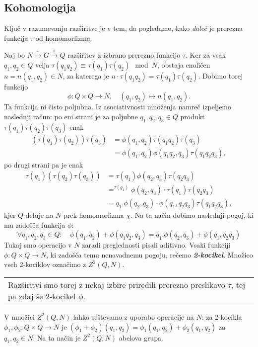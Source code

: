 \documentclass[11pt]{book}
\def\definicija{\color{rdeca}\bf\em}
\theoremstyle{definition}
\theoremstyle{zgled}
\theoremstyle{odprtproblem}
\theoremstyle{domacanaloga}
\theoremstyle{izrek}
\newenvironment{povzetek}
    {
\smallskip
\begin{center}
\color{svetlosiva}
\begin{tabular}{|p{0.7\textwidth}}
    }
    {
\end{tabular}
\end{center}
\smallskip
    }
\begin{document}
\subsection{Kohomologija}

Ključ v razumevanju razširitve je v tem, da pogledamo, kako {\em daleč} je prerezna funkcija $\tau$ od homomorfizma.

Naj bo $N \xrightarrow{\iota} G \xrightarrow{\pi} Q$ razširitev z izbrano prerezno funkcijo $\tau$. Ker za vsak $q_1, q_2 \in Q$ velja $\tau(q_1 q_2) \equiv \tau(q_1) \tau(q_2) \mod{N}$, obstaja enoličen $n = n(q_1, q_2) \in N$, za katerega je $n \cdot \tau(q_1q_2) = \tau(q_1)\tau(q_2)$. Dobimo torej funkcijo
\[
\phi \colon Q \times Q \to N, \quad (q_1, q_2) \mapsto n(q_1, q_2).
\]
Ta funkcija ni čisto poljubna. Iz asociativnosti množenja namreč izpeljemo naslednji račun: po eni strani je za poljubne $q_1, q_2, q_3 \in Q$ produkt $\tau(q_1) \tau(q_2) \tau(q_3)$ enak
\begin{align*}
(\tau(q_1) \tau(q_2)) \tau(q_3) &= \phi(q_1, q_2) \tau(q_1 q_2) \tau(q_3) \\
&= \phi(q_1, q_2) \phi(q_1 q_2, q_3) \tau(q_1 q_2 q_3),
\end{align*}
po drugi strani pa je enak
\begin{align*}
\tau(q_1) (\tau(q_2) \tau(q_3)) &= \tau(q_1) \phi(q_2, q_3) \tau(q_2 q_3) \\
&= ^{\tau(q_1)} \phi(q_2, q_3) \cdot \tau(q_1) \tau(q_2 q_3) \\
&= q_1.\phi(q_2, q_3) \cdot \phi(q_1, q_2 q_3) \tau(q_1 q_2 q_3),
\end{align*}
kjer $Q$ deluje na $N$ prek homomorfizma $\chi$. Na ta način dobimo naslednji pogoj, ki mu zadošča funkcija $\phi$:
\[
\forall q_1, q_2, q_3 \in Q \colon \quad
\phi(q_1, q_2) + \phi(q_1 q_2, q_3) = q_1.\phi(q_2, q_3) + \phi(q_1, q_2 q_3)
\]
Tukaj smo operacijo v $N$ zaradi preglednosti pisali aditivno. Vsaki funkciji $\phi \colon Q \times Q \to N$, ki zadošča temu nenavadnemu pogoju, rečemo {\definicija 2-kocikel}. Množico vseh $2$-kociklov označimo z {\definicija $Z^2(Q,N)$}.

\begin{povzetek}
Razširitvi smo torej z nekaj izbire priredili prerezno preslikavo $\tau$, tej pa zdaj še $2$-kocikel $\phi$.
\end{povzetek}

V množici $Z^2(Q,N)$ lahko seštevamo z uporabo operacije na $N$: za $2$-kocikla $\phi_1, \phi_2 \colon Q \times Q \to N$ je $(\phi_1 + \phi_2)(q_1, q_2) = \phi_1(q_1, q_2) + \phi_2(q_1, q_2)$ za $q_1, q_2 \in N$. Na ta način je $Z^2(Q,N)$ abelova grupa.
\end{document}
